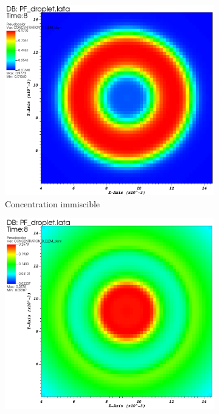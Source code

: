  \begin{figure}[H]
 	\centering
 	\begin{subfigure}[H]{0.32\textwidth}
 		\centering
 		\includegraphics[width=\textwidth]{figure/paysage_base/visit0000.png}
 		\caption{Concentration immiscible}
 		\label{fig:y equals x}
 	\end{subfigure}
 	\begin{subfigure}[H]{0.32\textwidth}
 		\centering
 		\includegraphics[width=\textwidth]{figure/paysage_base/visit0001.png}

\end{subfigure}
\end{figure}
